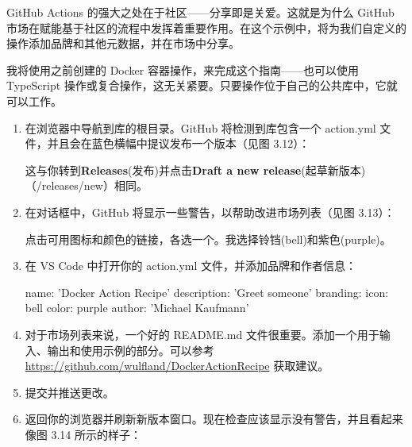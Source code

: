 GitHub Actions 的强大之处在于社区——分享即是关爱。这就是为什么 GitHub 市场在赋能基于社区的流程中发挥着重要作用。在这个示例中，将为我们自定义的操作添加品牌和其他元数据，并在市场中分享。


我将使用之前创建的 Docker 容器操作，来完成这个指南——也可以使用 TypeScript 操作或复合操作，这无关紧要。只要操作位于自己的公共库中，它就可以工作。


\begin{enumerate}
\item 
在浏览器中导航到库的根目录。GitHub 将检测到库包含一个 action.yml 文件，并且会在蓝色横幅中提议发布一个版本（见图 3.12）：


这与你转到\textbf{Releases}(发布)并点击\textbf{Draft a new release}(起草新版本)（/releases/new）相同。

\item 
在对话框中，GitHub 将显示一些警告，以帮助改进市场列表（见图 3.13）：


点击可用图标和颜色的链接，各选一个。我选择铃铛(bell)和紫色(purple)。

\item 
在 VS Code 中打开你的 action.yml 文件，并添加品牌和作者信息：

\begin{shell}
name: 'Docker Action Recipe'
description: 'Greet someone'
branding:
  icon: bell
  color: purple
author: 'Michael Kaufmann'
\end{shell}

\item 
对于市场列表来说，一个好的 README.md 文件很重要。添加一个用于输入、输出和使用示例的部分。可以参考 \url{https://github.com/wulfland/DockerActionRecipe} 获取建议。

\item 
提交并推送更改。

\item 
返回你的浏览器并刷新新版本窗口。现在检查应该显示没有警告，并且看起来像图 3.14 所示的样子：



\end{enumerate}
